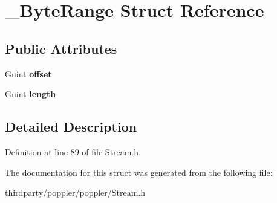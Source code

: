 \hypertarget{struct___byte_range}{}\section{\+\_\+\+Byte\+Range Struct Reference}
\label{struct___byte_range}
\subsection*{Public Attributes}
\begin{DoxyCompactItemize}
\item 
\mbox{\label{struct___byte_range_ad43a0afdbef0ac8bddf4af114356b9e4}} 
Guint {\bfseries offset}
\item 
\mbox{\label{struct___byte_range_a01fe8b135a2b90cecd4d83825e190f6d}} 
Guint {\bfseries length}
\end{DoxyCompactItemize}


\subsection{Detailed Description}


Definition at line 89 of file Stream.\+h.



The documentation for this struct was generated from the following file\+:\begin{DoxyCompactItemize}
\item 
thirdparty/poppler/poppler/Stream.\+h\end{DoxyCompactItemize}
